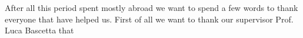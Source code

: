{\begin{Parallel}[c]{0.5\textwidth}{0.5\textwidth}
\renewcommand{\ParallelAtEnd}{\hfill\textit{Alain Boublil - Les Misérables}
}
\end{Parallel}
\clearpage

After all this period spent mostly abroad we want to spend a few words to thank everyone that have helped us. First of all we want to thank our supervisor Prof. Luca Bascetta that  





}
